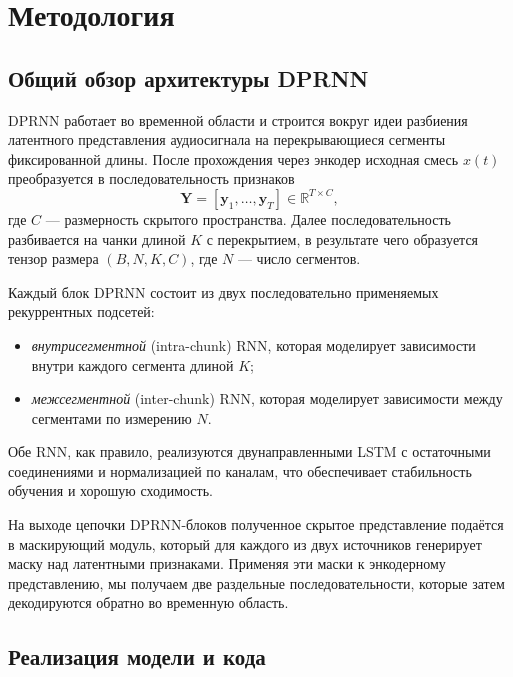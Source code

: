 \documentclass[10pt,conference,compsocconf]{IEEEtran}
\begin{document}
\section{Методология}

\subsection{Общий обзор архитектуры DPRNN}

DPRNN работает во временной области и строится вокруг идеи разбиения
латентного представления аудиосигнала на перекрывающиеся сегменты фиксированной длины.
После прохождения через энкодер исходная смесь $x(t)$
преобразуется в последовательность признаков
\[
\mathbf{Y} = [\mathbf{y}_1, \dots, \mathbf{y}_T] \in \mathbb{R}^{T \times C},
\]
где $C$ — размерность скрытого пространства. Далее последовательность
разбивается на чанки длиной $K$ с перекрытием, в результате чего
образуется тензор размера $(B, N, K, C)$, где $N$ — число сегментов.

Каждый блок DPRNN состоит из двух последовательно применяемых
рекуррентных подсетей:
\begin{itemize}
  \item \emph{внутрисегментной} (intra-chunk) RNN, которая моделирует
  зависимости внутри каждого сегмента длиной $K$;
  \item \emph{межсегментной} (inter-chunk) RNN, которая моделирует
  зависимости между сегментами по измерению $N$.
\end{itemize}
Обе RNN, как правило, реализуются двунаправленными LSTM с остаточными
соединениями и нормализацией по каналам, что обеспечивает стабильность
обучения и хорошую сходимость.

На выходе цепочки DPRNN-блоков полученное скрытое представление
подаётся в маскирующий модуль, который для каждого из двух источников
генерирует маску над латентными признаками. Применяя эти маски
к энкодерному представлению, мы получаем две раздельные последовательности,
которые затем декодируются обратно во временную область.

\subsection{Реализация модели и кода}
\end{document}
